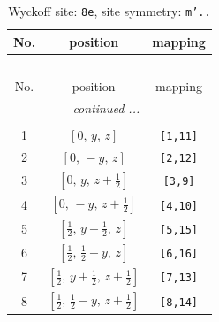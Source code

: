 \documentclass[fleqn,8pt]{jsarticle}
\begin{document}
\begin{longtable}{ccc}
\caption{Wyckoff site: {\tt 8e}, site symmetry: {\tt m'..}}
 \\
 \hline \hline
No. & position & mapping \\ \hline \endfirsthead

\multicolumn{2}{l}{\tablename\ \thetable{}} \\
 \hline \hline
No. & position & mapping \\ \hline \endhead

 \hline \hline
\multicolumn{2}{r}{\footnotesize\it continued ...} \\ \endfoot

 \hline \hline
\multicolumn{2}{r}{} \\ \endlastfoot

1 & $\left[ 0,\, y,\, z \right]$ & {\tt [1,11]} \\ \hline
2 & $\left[ 0,\, - y,\, z \right]$ & {\tt [2,12]} \\ \hline
3 & $\left[ 0,\, y,\, z + \frac{1}{2} \right]$ & {\tt [3,9]} \\ \hline
4 & $\left[ 0,\, - y,\, z + \frac{1}{2} \right]$ & {\tt [4,10]} \\ \hline
5 & $\left[ \frac{1}{2},\, y + \frac{1}{2},\, z \right]$ & {\tt [5,15]} \\ \hline
6 & $\left[ \frac{1}{2},\, \frac{1}{2} - y,\, z \right]$ & {\tt [6,16]} \\ \hline
7 & $\left[ \frac{1}{2},\, y + \frac{1}{2},\, z + \frac{1}{2} \right]$ & {\tt [7,13]} \\ \hline
8 & $\left[ \frac{1}{2},\, \frac{1}{2} - y,\, z + \frac{1}{2} \right]$ & {\tt [8,14]} \\
\end{longtable}
\renewcommand{\arraystretch}{1.2}
\end{document}
